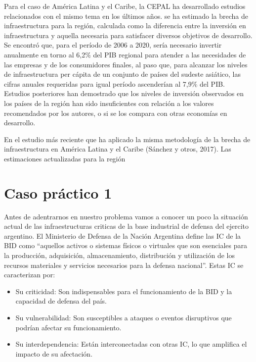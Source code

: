 \documentclass{article}
\providecommand{\tightlist}{%
  \setlength{\itemsep}{0pt}\setlength{\parskip}{0pt}}
\begin{document}
Para el caso de América Latina y el Caribe, la CEPAL ha desarrollado
estudios relacionados con el mismo tema en los últimos años. se ha
estimado la brecha de infraestructura para la región, calculada como la
diferencia entre la inversión en infraestructura y aquella necesaria
para satisfacer diversos objetivos de desarrollo. Se encontró que, para
el período de 2006 a 2020, sería necesario invertir anualmente en torno
al 6,2\% del PIB regional para atender a las necesidades de las empresas
y de los consumidores finales, al paso que, para alcanzar los niveles de
infraestructura per cápita de un conjunto de países del sudeste
asiático, las cifras anuales requeridas para igual período ascenderían
al 7,9\% del PIB. Estudios posteriores han demostrado que los niveles de
inversión observados en los países de la región han sido insuficientes
con relación a los valores recomendados por los autores, o si se los
compara con otras economías en desarrollo.

En el estudio más reciente que ha aplicado la misma metodología de la
brecha de infraestructura en América Latina y el Caribe (Sánchez y
otros, 2017). Las estimaciones actualizadas para la región

\hypertarget{caso-pruxe1ctico-1}{%
\section{Caso práctico 1}\label{caso-pruxe1ctico-1}}

Antes de adentrarnos en nuestro problema vamos a conocer un poco la
situación actual de las infraestructuras criticas de la base industrial
de defensa del ejercito argentino. El Ministerio de Defensa de la Nación
Argentina define las IC de la BID como ``aquellos activos o sistemas
físicos o virtuales que son esenciales para la producción, adquisición,
almacenamiento, distribución y utilización de los recursos materiales y
servicios necesarios para la defensa nacional''. Estas IC se
caracterizan por:

\begin{itemize}
\tightlist
\item
  Su criticidad: Son indispensables para el funcionamiento de la BID y
  la capacidad de defensa del país.
\item
  Su vulnerabilidad: Son susceptibles a ataques o eventos disruptivos
  que podrían afectar su funcionamiento.
\item
  Su interdependencia: Están interconectadas con otras IC, lo que
  amplifica el impacto de su afectación.
\end{itemize}
\end{document}
